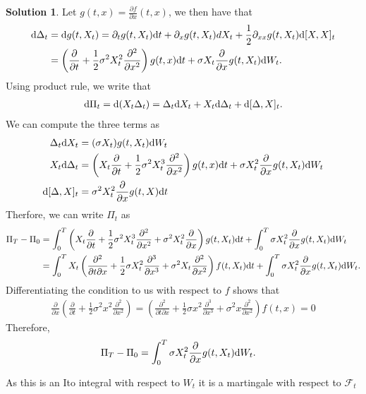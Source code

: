 \documentclass[12pt]{article}
\newcommand{\calF}{\mathcal{F}}
\theoremstyle{definition}
\newtheorem{sol}{Solution}
\theoremstyle{remark}
\def\d{{\rm d}}
\begin{document}
\begin{sol}
Let $g(t,x) = \frac{\partial f}{\partial x}(t, x)$, we then have that
\begin{align*}
    \d \Delta_{t} &= \d g(t, X_{t}) = \partial_{t} g(t, X_{t}) \d t + \partial_{x} g(t, X_{t})dX_{t} + \frac{1}{2} \partial_{xx} g(t, X_{t}) \d [X, X]_{t}\\
                  &= \left( \frac{\partial}{\partial t } + \frac{1}{2} \sigma^{2} X^{2}_{t} \frac{\partial^{2} }{\partial x^{2}}\right) g(t, x) \d t + \sigma X_{t} \frac{\partial }{\partial x} g(t, X_{t})  \d W_{t}.
\end{align*}
Using product rule, we write that
\begin{align*}
    \d \Pi_{t} = \d(X_{t} \Delta_{t})=\Delta_{t} \d X_{t} + X_{t} \d \Delta_{t} + \d [\Delta, X]_{t}.
\end{align*}
We can compute the three terms as
\begin{align*}
    \Delta_{t} \d X_{t} &= (\sigma X_{t}) g(t, X_{t}) \d W_{t}\\
    X_{t} \d \Delta_{t} &= \left( X_{t} \frac{\partial}{\partial t } + \frac{1}{2} \sigma^{2} X^{3}_{t} \frac{\partial^{2} }{\partial x^{2}}\right) g(t, x)  \d t + \sigma X_{t}^{2} \frac{\partial }{\partial x}   g(t, X_{t}) \d W_{t}\\
    \d [\Delta, X]_{t} &= \sigma^{2} X_{t}^{2} \frac{\partial}{\partial x} g(t,X) \d t
\end{align*}
Therfore, we can write $\Pi_{t}$ as
\begin{align*}
    \Pi_{T} - \Pi_{0} &= \int_{0}^{T} \left( X_{t} \frac{\partial}{\partial t } + \frac{1}{2} \sigma^{2} X^{3}_{t} \frac{\partial^{2} }{\partial x^{2}} + \sigma^{2} X_{t}^{2} \frac{\partial}{\partial x} \right) g(t, X_{t}) \d t + \int_{0}^{T} \sigma X_{t}^{2} \frac{\partial }{\partial x}   g(t, X_{t}) \d W_{t}\\
                      &= \int_{0}^{T} X_{t} \left(\frac{\partial^{2}}{\partial t \partial x} + \frac{1}{2}\sigma X_{t}^{2} \frac{\partial^{3} }{\partial x^{3}} + \sigma^{2} X_{t} \frac{\partial^{2} }{\partial x^{2}}  \right)f(t,X_{t} ) \d t  + \int_{0}^{T} \sigma X_{t}^{2} \frac{\partial }{\partial x}   g(t, X_{t}) \d W_{t}.
\end{align*}
Differentiating the condition to us with respect to $f$ shows that
\begin{align*}
        \frac{\partial }{\partial x} \left( \frac{\partial }{\partial t} + \frac{1}{2} \sigma^{2} x^{2} \frac{\partial^{2} }{\partial x^{2}}  \right) = \left(\frac{\partial^{2}}{\partial t \partial x} + \frac{1}{2}\sigma x^{2} \frac{\partial^{3} }{\partial x^{3}} + \sigma^{2} x \frac{\partial^{2} }{\partial x^{2}}  \right)f(t, x) = 0
\end{align*}
Therefore, 
\begin{align*}
\Pi_{T} - \Pi_{0} &= \int_{0}^{T} \sigma X_{t}^{2} \frac{\partial }{\partial x}   g(t, X_{t}) \d W_{t}.
\end{align*}

As this is an Ito integral with respect to $W_{t}$ it is a martingale with respect to $\calF_{t}$
\end{sol}
\end{document}
